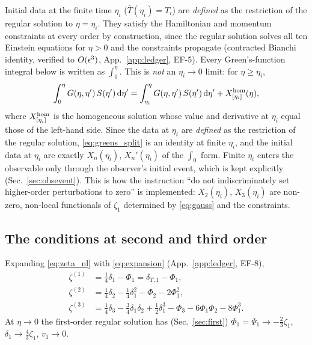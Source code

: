 Initial data at the finite time $\eta_i$ ($\bar T(\eta_i)=T_i$) are \emph{defined} as the restriction of the
regular solution to $\eta=\eta_i$.  They satisfy the Hamiltonian and momentum constraints at every order
by construction, since the regular solution solves all ten Einstein equations for $\eta>0$ and the constraints
propagate (contracted Bianchi identity, verified to $O(\epsilon^3)$, App.~\ref{app:ledger}, EF-5).
Every Green's-function integral below is written as $\int_0^\eta$.  This is \emph{not} an $\eta_i\to0$ limit: for $\eta\ge\eta_i$,
\begin{equation}
\int_0^\eta G(\eta,\eta')\,S(\eta')\,\mathrm d\eta'=\int_{\eta_i}^\eta G(\eta,\eta')\,S(\eta')\,\mathrm d\eta'+X^{\rm hom}_{[\eta_i]}(\eta),
\label{eq:greens_split}
\end{equation}
where $X^{\rm hom}_{[\eta_i]}$ is the homogeneous solution whose value and derivative at $\eta_i$ equal those of the left-hand side.
Since the data at $\eta_i$ are \emph{defined} as the restriction of the regular solution, \eqref{eq:greens_split} is an identity
at finite $\eta_i$, and the initial data at $\eta_i$ are exactly $X_n(\eta_i)$, $X_n'(\eta_i)$ of the $\int_0$ form.  Finite $\eta_i$
enters the observable only through the observer's initial event, which is kept explicitly (Sec.~\ref{sec:obsevent}).  This is how the instruction ``do not indiscriminately set higher-order
perturbations to zero'' is implemented: $X_2(\eta_i)$, $X_3(\eta_i)$ are non-zero, non-local functionals of
$\zeta_1$ determined by \eqref{eq:gauss} and the constraints.

\subsection{The conditions at second and third order}
\label{sec:zeta_cond}
Expanding \eqref{eq:zeta_nl} with \eqref{eq:expansion} (App.~\ref{app:ledger}, EF-8),
\begin{align}
\zeta^{(1)}&=\tfrac14\delta_1-\Phi_1=\delta_{T,1}-\Phi_1,\label{eq:zeta1}\\
\zeta^{(2)}&=\tfrac14\delta_2-\tfrac14\delta_1^2-\Phi_2-2\Phi_1^2,\label{eq:zeta2}\\
\zeta^{(3)}&=\tfrac14\delta_3-\tfrac34\delta_1\delta_2+\tfrac12\delta_1^3-\Phi_3-6\Phi_1\Phi_2-8\Phi_1^3 .\label{eq:zeta3}
\end{align}
At $\eta\to0$ the first-order regular solution has (Sec.~\ref{sec:first})
$\Phi_1=\Psi_1\to-\tfrac23\zeta_1$, $\delta_1\to\tfrac43\zeta_1$, $v_1\to0$.

